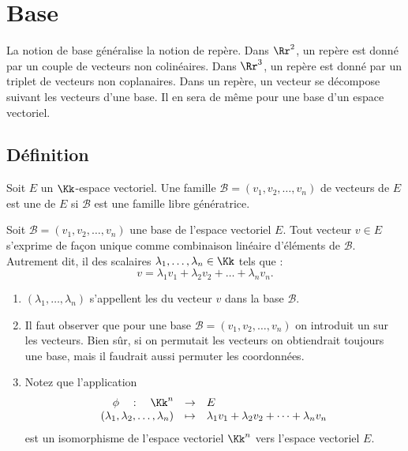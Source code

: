 \documentclass[class=report,crop=false]{standalone}
\begin{document}
\section{Base}

La notion de base généralise la notion de repère.
Dans $\Rr^2$, un repère est donné par un couple de vecteurs
non colinéaires. Dans $\Rr^ 3$, un repère est donné par un
triplet de vecteurs non coplanaires.  Dans un repère,
un vecteur se décompose suivant les vecteurs d'une base.
Il en sera de même pour une base d'un espace vectoriel.

\subsection{Définition}

\begin{definition}
Soit $E$ un $\Kk$-espace vectoriel.
Une famille $\mathcal{B}= (v_1, v_2, \dots , v_n)$ de vecteurs de $E$
est une  de $E$
si $\mathcal{B}$ est une famille libre  génératrice.
\end{definition}

\begin{theoreme}
\label{th:coordonnees}
Soit $\mathcal{B} = (v_1, v_2, \dots , v_n)$ une base de l'espace vectoriel $E$.
Tout vecteur $v \in E$ s'exprime de façon unique comme combinaison
linéaire d'éléments de $\mathcal{B}$.
Autrement dit, il  des scalaires $\lambda_1,\ldots,\lambda_n \in \Kk$
 tels que :
$$v = \lambda_1 v_1 + \lambda_2 v_2 + \dots + \lambda_n v_n.$$
\end{theoreme}

\begin{remarque*}
\sauteligne
\begin{enumerate}
  \item $(\lambda_1, \dots , \lambda_n)$ s'appellent les  du vecteur $v$
dans la base $\mathcal{B}$.

  \item Il faut observer que pour une base $\mathcal{B} = (v_1, v_2, \dots , v_n)$
on introduit un  sur les vecteurs.
Bien sûr, si on permutait les vecteurs on obtiendrait toujours une base,
mais il faudrait aussi permuter les coordonnées.

  \item Notez que l'application
$$\begin{array}{rcl}
\phi \quad : \quad  \Kk^n & \to & E\\
(\lambda_1, \lambda_2, \dots , \lambda_n) & \mapsto & \lambda_1v_1+ \lambda_2v_2+ \dots +
\lambda_nv_n
  \end{array}$$
  est un isomorphisme de l'espace vectoriel $\Kk^n$ vers l'espace vectoriel $E$.
\end{enumerate}
\end{remarque*}
\end{document}
